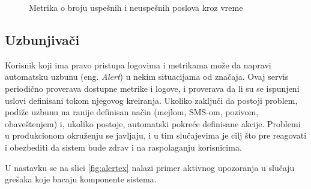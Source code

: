 \documentclass[12pt,oneside]{memoir}
\begin{document}
\begin{figure}[!ht]
  \centering
  \caption{Metrika o broju uspešnih i neuspešnih poslova kroz vreme}
  \label{fig:succeeded_vs_failed_jobs}
\end{figure}

\subsection{Uzbunjivači}

Korisnik koji ima pravo pristupa logovima i metrikama može da napravi automatsku uzbunu (eng. \emph{Alert}) u nekim situacijama od značaja. Ovaj servis periodično proverava dostupne metrike i logove, i proverava da li su se ispunjeni uslovi definisani tokom njegovog kreiranja. Ukoliko zaključi da postoji problem, podiže uzbunu na ranije definisan način (mejlom, SMS-om, pozivom, obaveštenjem) i, ukoliko postoje, automatski pokreće definisane akcije. Problemi u produkcionom okruženju se javljaju, i u tim slučajevima je cilj što pre reagovati i obezbediti da sistem bude zdrav i na raspolaganju korisnicima.

U nastavku se na slici \ref{fig:alertex} nalazi primer aktivnog upozoranja u slučaju grešaka koje bacaju komponente sistema.
\end{document}
